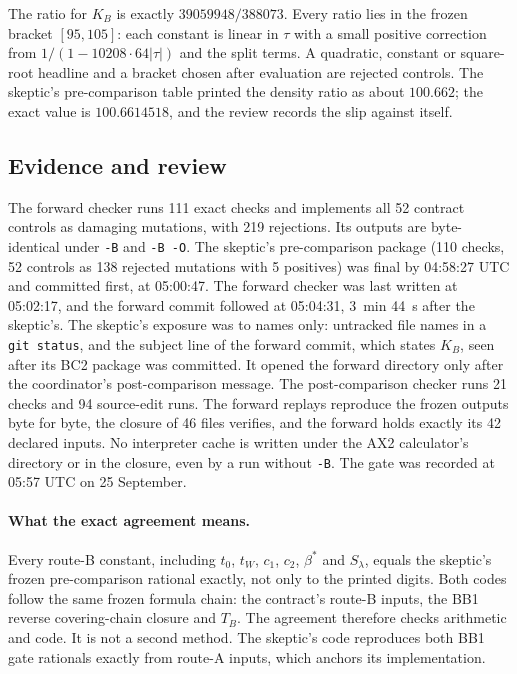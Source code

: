 The ratio for $K_B$ is exactly $39059948/388073$. Every ratio lies in the
frozen bracket $[95,105]$: each constant is linear in
$\tau$ with a small positive correction from $1/(1-10208\cdot64|\tau|)$ and the
split terms. A quadratic, constant or square-root headline and a bracket
chosen after evaluation are rejected controls. The skeptic's pre-comparison
table printed the density ratio as about $100.662$; the exact value is
$100.6614518$, and the review records the slip against itself.

\subsection{Evidence and review}
\label{sec:bc2-evidence}
The forward checker runs 111 exact checks and implements all 52 contract
controls as damaging mutations, with 219 rejections. Its outputs are
byte-identical under \texttt{-B} and \texttt{-B -O}. The skeptic's
pre-comparison package (110 checks, 52 controls as 138 rejected mutations
with 5 positives) was final by 04:58:27 UTC and committed first, at 05:00:47.
The forward checker was last written at 05:02:17, and the forward commit
followed at 05:04:31, 3~min 44~s after the skeptic's.
The skeptic's exposure was to names only: untracked file names in a
\texttt{git status}, and the subject line of the forward commit, which states
$K_B$, seen after its BC2 package was committed. It opened the forward
directory only after the coordinator's post-comparison message. The
post-comparison checker runs 21 checks and 94 source-edit runs. The forward
replays reproduce the frozen outputs byte for byte, the closure of 46 files
verifies, and the forward holds exactly its 42 declared inputs. No interpreter
cache is written under the AX2 calculator's directory or in the closure, even
by a run without \texttt{-B}. The gate was recorded at 05:57 UTC on 25
September.

\paragraph{What the exact agreement means.} Every route-B constant, including
$t_0$, $t_W$, $c_1$, $c_2$, $\beta^*$ and $S_\lambda$, equals the skeptic's
frozen pre-comparison rational exactly, not only to the printed digits. Both
codes follow the same frozen formula chain: the contract's route-B inputs,
the BB1 reverse covering-chain closure and $T_B$. The agreement therefore
checks arithmetic and code. It is not a second method. The skeptic's code
reproduces both BB1 gate  rationals exactly from route-A
inputs, which anchors its implementation.

